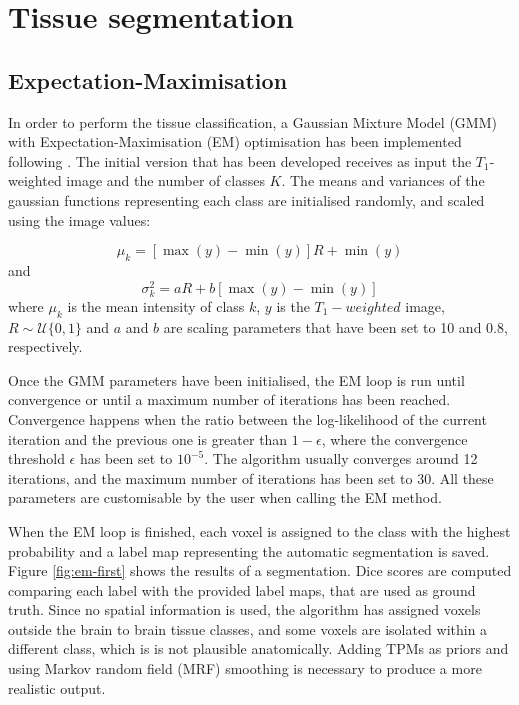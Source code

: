 \section{Tissue segmentation}


\subsection{Expectation-Maximisation}
In order to perform the tissue classification, a Gaussian Mixture Model (GMM) with Expectation-Maximisation (EM) optimisation has been implemented following \cite{leemput_automated_1999-1}. The initial version that has been developed receives as input the $T_1$-weighted image and the number of classes $K$. The means and variances of the gaussian functions representing each class are initialised randomly, and scaled using the image values:

\begin{equation}
  \mu_k = [\max(y) - \min(y)] R + \min(y)
\end{equation}
and
\begin{equation}
  \sigma^2_k = a R + b [\max(y) - \min(y)]
\end{equation}
where $\mu_k$ is the mean intensity of class $k$, $y$ is the $T_1-weighted$ image, $R \sim \mathcal{U}\{0, 1\}$ and $a$ and $b$ are scaling parameters that have been set to 10 and 0.8, respectively.

Once the GMM parameters have been initialised, the EM loop is run until convergence or until a maximum number of iterations has been reached. Convergence happens when the ratio between the log-likelihood of the current iteration and the previous one is greater than $1 - \epsilon$, where the convergence threshold $\epsilon$ has been set to $10^{-5}$. The algorithm usually converges around 12 iterations, and the maximum number of iterations has been set to 30. All these parameters are customisable by the user when calling the EM method.

When the EM loop is finished, each voxel is assigned to the class with the highest probability and a label map representing the automatic segmentation is saved. Figure \ref{fig:em-first} shows the results of a segmentation. Dice scores are computed comparing each label with the provided label maps, that are used as ground truth. Since no spatial information is used, the algorithm has assigned voxels outside the brain to brain tissue classes, and some voxels are isolated within a different class, which is is not plausible anatomically. Adding TPMs as priors and using Markov random field (MRF) smoothing is necessary to produce a more realistic output.

